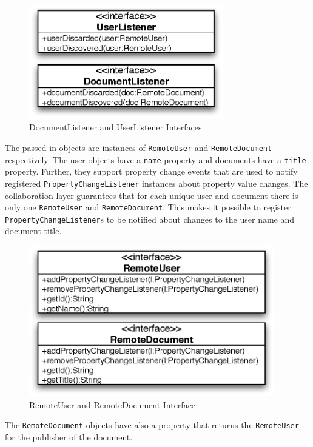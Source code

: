 \begin{figure}[H]
 \centering
 \includegraphics[width=8.47cm,height=4.97cm]{../images/finalreport/architecture_listener_uml.eps}
 \caption{DocumentListener and UserListener Interfaces}
\end{figure}

The passed in objects are instances of \texttt{RemoteUser} and
\texttt{RemoteDocument} respectively. The user objects have a \texttt{name}
property and documents have a \texttt{title} property. Further, they support
property change events that are used to notify registered 
\texttt{PropertyChangeListener} instances about property value changes. 
The collaboration layer guarantees that for each unique user and document
there is only one \texttt{RemoteUser} and \texttt{RemoteDocument}. This makes
it possible to register \texttt{PropertyChangeListener}s to be notified about
changes to the user name and document title. 

\begin{figure}[H]
 \centering
 \includegraphics[width=10.69cm,height=6.56cm]{../images/finalreport/architecture_userdocument_uml.eps}
 \caption{RemoteUser and RemoteDocument Interface}
\end{figure}


The
\texttt{RemoteDocument} objects have also a property that returns the
\texttt{RemoteUser} for the publisher of the document.


